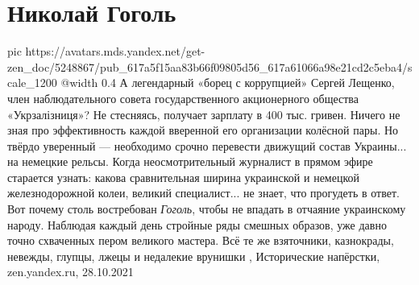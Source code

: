  
 
 
 
 
\chapter{Николай Гоголь}

\ifcmt
  pic https://avatars.mds.yandex.net/get-zen_doc/5248867/pub_617a5f15aa83b66f09805d56_617a61066a98e21cd2c5eba4/scale_1200
  @width 0.4
\fi
А легендарный «борец с коррупцией» Сергей Лещенко, член наблюдательного совета
государственного акционерного общества «Укрзалізниця»? Не стесняясь, получает
зарплату в 400 тыс. гривен. Ничего не зная про эффективность каждой вверенной
его организации колёсной пары.  Но твёрдо уверенный — необходимо срочно
перевести движущий состав Украины... на немецкие рельсы. Когда неосмотрительный
журналист в прямом эфире старается узнать: какова сравнительная ширина
украинской и немецкой железнодорожной колеи, великий специалист... не знает,
что прогудеть в ответ.  Вот почему столь востребован \emph{Гоголь}, чтобы не
впадать в отчаяние украинскому народу.  Наблюдая каждый день стройные ряды
смешных образов, уже давно точно схваченных пером великого мастера. Всё те же
взяточники, казнокрады, невежды, глупцы, лжецы и недалекие врунишки
, 
Исторические напёрстки, zen.yandex.ru, 28.10.2021
